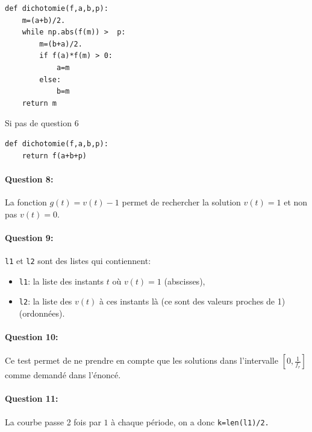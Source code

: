 \begin{center}
\begin{verbatim}
def dichotomie(f,a,b,p):
    m=(a+b)/2.
    while np.abs(f(m)) >  p:
        m=(b+a)/2.
        if f(a)*f(m) > 0:
            a=m
        else:
            b=m
    return m
\end{verbatim}
\end{center}

Si pas de question 6

\begin{center}
\begin{verbatim}
def dichotomie(f,a,b,p):
    return f(a+b+p)
\end{verbatim}
\end{center}

\paragraph{Question 8:}

La fonction $g(t)=v(t)-1$ permet de rechercher la solution $v(t)=1$ et non pas $v(t)=0$.

\paragraph{Question 9:}

\verb?l1? et \verb?l2? sont des listes qui contiennent:
\begin{itemize}
 \item \verb?l1?: la liste des instants $t$ où $v(t)=1$ (abscisses),
 \item \verb?l2?: la liste des $v(t)$ à ces instants là (ce sont des valeurs proches de 1) (ordonnées).
\end{itemize}

\paragraph{Question 10:}

Ce test permet de ne prendre en compte que les solutions dans l'intervalle $\left[0,\frac{1}{f_r}\right]$ comme demandé dans l'énoncé.

\paragraph{Question 11:}

La courbe passe 2 fois par $1$ à chaque période, on a donc \verb?k=len(l1)/2.?

